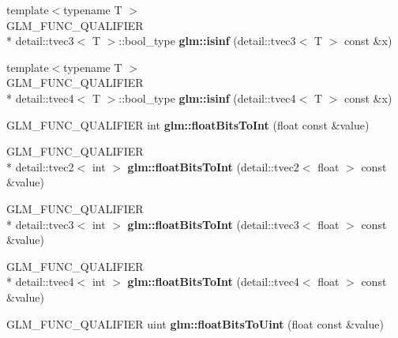 \begin{DoxyCompactItemize}
\item 
\hypertarget{namespaceglm_ae37f4d04e4a07794197f30ec2cf3f034}{{\footnotesize template$<$typename T $>$ }\\G\-L\-M\-\_\-\-F\-U\-N\-C\-\_\-\-Q\-U\-A\-L\-I\-F\-I\-E\-R \\*
detail\-::tvec3$<$ T $>$\-::bool\-\_\-type {\bfseries glm\-::isinf} (detail\-::tvec3$<$ T $>$ const \&x)}\label{namespaceglm_ae37f4d04e4a07794197f30ec2cf3f034}

\item 
\hypertarget{namespaceglm_ad2670da17fe5420caee266f86c1de00e}{{\footnotesize template$<$typename T $>$ }\\G\-L\-M\-\_\-\-F\-U\-N\-C\-\_\-\-Q\-U\-A\-L\-I\-F\-I\-E\-R \\*
detail\-::tvec4$<$ T $>$\-::bool\-\_\-type {\bfseries glm\-::isinf} (detail\-::tvec4$<$ T $>$ const \&x)}\label{namespaceglm_ad2670da17fe5420caee266f86c1de00e}

\item 
\hypertarget{namespaceglm_a9d47b5d53fd4686a4f6e94bfd13d8b87}{G\-L\-M\-\_\-\-F\-U\-N\-C\-\_\-\-Q\-U\-A\-L\-I\-F\-I\-E\-R int {\bfseries glm\-::float\-Bits\-To\-Int} (float const \&value)}\label{namespaceglm_a9d47b5d53fd4686a4f6e94bfd13d8b87}

\item 
\hypertarget{namespaceglm_a1786fff7a5ce08d23d41c3ce0c3bb3da}{G\-L\-M\-\_\-\-F\-U\-N\-C\-\_\-\-Q\-U\-A\-L\-I\-F\-I\-E\-R \\*
detail\-::tvec2$<$ int $>$ {\bfseries glm\-::float\-Bits\-To\-Int} (detail\-::tvec2$<$ float $>$ const \&value)}\label{namespaceglm_a1786fff7a5ce08d23d41c3ce0c3bb3da}

\item 
\hypertarget{namespaceglm_ad15d33ead0f23cc3f30437a6779e4a34}{G\-L\-M\-\_\-\-F\-U\-N\-C\-\_\-\-Q\-U\-A\-L\-I\-F\-I\-E\-R \\*
detail\-::tvec3$<$ int $>$ {\bfseries glm\-::float\-Bits\-To\-Int} (detail\-::tvec3$<$ float $>$ const \&value)}\label{namespaceglm_ad15d33ead0f23cc3f30437a6779e4a34}

\item 
\hypertarget{namespaceglm_a4e90abc22816cc552c342224dfe5bc1b}{G\-L\-M\-\_\-\-F\-U\-N\-C\-\_\-\-Q\-U\-A\-L\-I\-F\-I\-E\-R \\*
detail\-::tvec4$<$ int $>$ {\bfseries glm\-::float\-Bits\-To\-Int} (detail\-::tvec4$<$ float $>$ const \&value)}\label{namespaceglm_a4e90abc22816cc552c342224dfe5bc1b}

\item 
\hypertarget{namespaceglm_af4b02db577db5f494b887e5fab3159c9}{G\-L\-M\-\_\-\-F\-U\-N\-C\-\_\-\-Q\-U\-A\-L\-I\-F\-I\-E\-R uint {\bfseries glm\-::float\-Bits\-To\-Uint} (float const \&value)}\label{namespaceglm_af4b02db577db5f494b887e5fab3159c9}


\end{DoxyCompactItemize}

